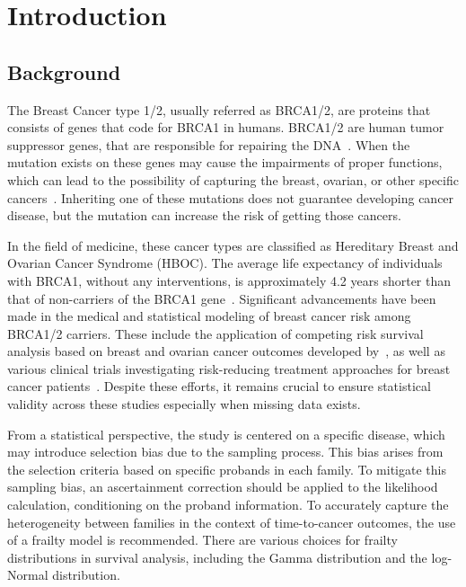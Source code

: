\chapter{Introduction}
\section{Background}
The Breast Cancer type 1/2, usually referred as BRCA1/2, are proteins that consists of genes that code for BRCA1 in humans. BRCA1/2 are human tumor suppressor genes, that are responsible for repairing the DNA~\cite{duncan1998brca1}. 
When the mutation exists on these genes may cause the impairments of proper functions, which can lead to the possibility of capturing the breast, ovarian, or other specific cancers~\cite{haffty2002outcome, huang2018association}. 
Inheriting one of these mutations does not guarantee developing cancer disease, but the mutation can increase the risk of getting those cancers. 

In the field of medicine, these cancer types are classified as Hereditary Breast and Ovarian Cancer Syndrome (HBOC). 
The average life expectancy of individuals with BRCA1, without any interventions, is approximately 4.2 years shorter than that of non-carriers of the BRCA1 gene~\cite{lux2006hereditary}.
Significant advancements have been made in the medical and statistical modeling of breast cancer risk among BRCA1/2 carriers. These include the application of competing risk survival analysis based on breast and ovarian cancer outcomes developed by~\citet{choi2021competing}, as well as various clinical trials investigating risk-reducing treatment approaches for breast cancer patients~\cite{choi2021association}.
Despite these efforts, it remains crucial to ensure statistical validity across these studies especially when missing data exists.

From a statistical perspective, the study is centered on a specific disease, which may introduce selection bias due to the sampling process. 
This bias arises from the selection criteria based on specific probands in each family. 
To mitigate this sampling bias, an ascertainment correction should be applied to the likelihood calculation, conditioning on the proband information.
To accurately capture the heterogeneity between families in the context of time-to-cancer outcomes, the use of a frailty model is recommended. 
There are various choices for frailty distributions in survival analysis, including the Gamma distribution and the log-Normal distribution.

